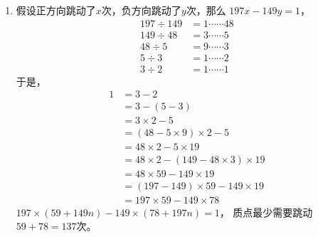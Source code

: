 \begin{enumerate}[label={\textbf{\thechapter.\arabic*}},leftmargin=
    \inteval{\myenumleftmargin}pt]
\item 假设正方向跳动了$x$次，负方向跳动了$y$次，那么
$ 197x-149y=1 $，
\begin{align*}
    197\div 149 &=1 \cdots\cdots 48 \\
    149\div  48 &=3 \cdots\cdots 5  \\
    48\div   5 &=9 \cdots\cdots 3 \\
    5\div   3 &=1 \cdots\cdots 2 \\
    3\div   2 &=1 \cdots\cdots 1 
\end{align*}
于是，
\begin{align*}
    1 &= 3-2 \\
    &= 3-(5-3) \\
    &= 3\times 2-5\\
    &= (48-5\times 9)\times 2-5\\
    &= 48\times 2-5\times 19 \\
    &= 48\times 2-(149-48\times 3)\times 19 \\
    &= 48\times 59-149\times 19 \\
    &= (197-149)\times 59-149\times 19 \\
    &= 197\times 59-149\times 78    
\end{align*}
$ 197\times(59+149n)-149\times(78+197n)=1 $，
质点最少需要跳动$59+78=137$次。
 
\end{enumerate}
\myfootnote{\CopyrightStatementChap}
\cleardoublepage

